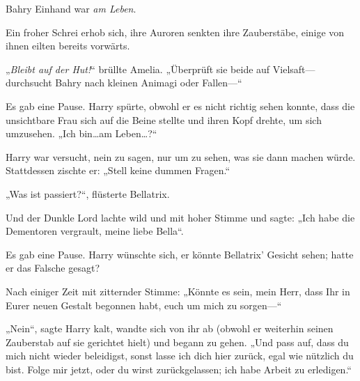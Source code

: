 Bahry Einhand war \emph{am Leben}.

Ein froher Schrei erhob sich, ihre Auroren senkten ihre Zauberstäbe, einige von ihnen eilten bereits vorwärts.

„\emph{Bleibt auf der Hut!}“ brüllte Amelia. „Überprüft sie beide auf Vielsaft—durchsucht Bahry nach kleinen Animagi oder Fallen—“

\later

 

Es gab eine Pause. Harry spürte, obwohl er es nicht richtig sehen konnte, dass die unsichtbare Frau sich auf die Beine stellte und ihren Kopf drehte, um sich umzusehen. „Ich bin…am Leben…?“

Harry war versucht, nein zu sagen, nur um zu sehen, was sie dann machen würde. Stattdessen zischte er: „Stell keine dummen Fragen.“

„Was ist passiert?“, flüsterte Bellatrix.

Und der Dunkle Lord lachte wild und mit hoher Stimme und sagte: „Ich habe die Dementoren vergrault, meine liebe Bella“.

Es gab eine Pause. Harry wünschte sich, er könnte Bellatrix’ Gesicht sehen; hatte er das Falsche gesagt?

Nach einiger Zeit mit zitternder Stimme: „Könnte es sein, mein Herr, dass Ihr in Eurer neuen Gestalt begonnen habt, euch um mich zu sorgen—“

„Nein“, sagte Harry kalt, wandte sich von ihr ab (obwohl er weiterhin seinen Zauberstab auf sie gerichtet hielt) und begann zu gehen. „Und pass auf, dass du mich nicht wieder beleidigst, sonst lasse ich dich hier zurück, egal wie nützlich du bist. Folge mir jetzt, oder du wirst zurückgelassen; ich habe Arbeit zu erledigen.“

